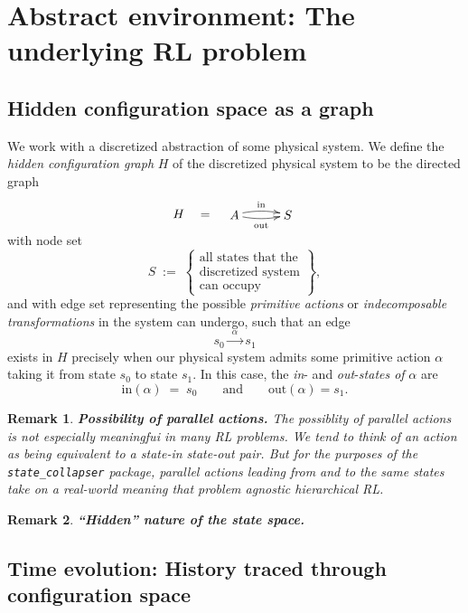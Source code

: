 \documentclass[11pt]{article}
\newtheorem{remark}{Remark}[subsection]
\begin{document}
\section{Abstract environment: The underlying RL problem}

\subsection{Hidden configuration space as a graph}
We work with a discretized abstraction of some physical system. We define the {\em hidden configuration graph} $H$ of the discretized physical system to be the directed graph
$$
H
\quad=\quad
\begin{xy}
(0,0)*+{A}="1";
(15,0)*+{S}="0";
{\ar@/^3pt/^{\text{in}} "1", "0"}
{\ar@/_3pt/_{\text{out}} "1", "0"}
\end{xy}
$$
with node set
$$
S\;:=\;\left\{\!\!
\begin{array}{c}
\text{all states that the}\\ \text{discretized system}\\ \text{can occupy}
\end{array}
\!\!\right\},
$$
and with edge set representing the possible {\em primitive actions} or {\em indecomposable transformations} in the system can undergo, such that an edge
$$
s_{0}\xrightarrow{\ \ \alpha\ \ }s_{1}
$$
exists in $H$ precisely when our physical system admits some primitive action $\alpha$ taking it from state $s_{0}$ to state $s_{1}$. In this case, the {\em in}- and {\em out}-{\em states of} $\alpha$ are
$$
\text{in}(\alpha)\;=\;s_{0}\quad\quad\text{and}\quad\quad\text{out}(\alpha)=s_{1}.
$$

\begin{remark}
{\bf Possibility of parallel actions.}
\normalfont
The possiblity of parallel actions is not especially meaningfui in many RL problems. We tend to think of an action as being equivalent to a state-in state-out pair. But for the purposes of the \texttt{state\_collapser} package, parallel actions leading from and to the same states take on a real-world meaning that problem agnostic hierarchical RL.
\end{remark}

\begin{remark}
{\bf ``Hidden'' nature of the state space.}
\end{remark}

\subsection{Time evolution: History traced through configuration space}
\end{document}
